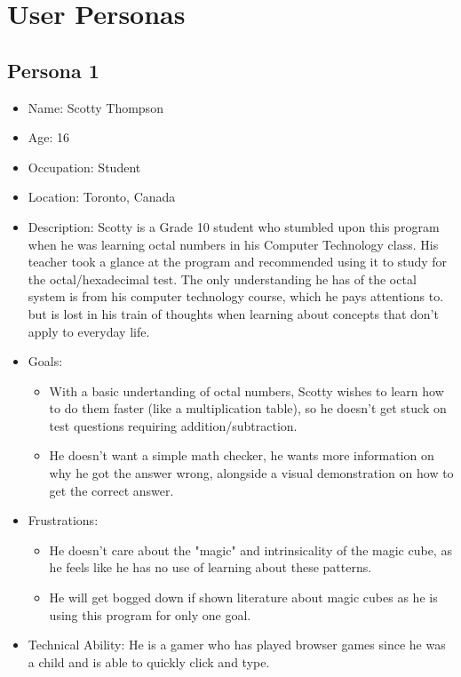 \documentclass[12pt]{article}
\begin{document}

\section{User Personas}

\subsection{Persona 1}
\begin{itemize}
\item Name: Scotty Thompson
\item Age: 16
\item Occupation: Student
\item Location: Toronto, Canada
\item Description: Scotty is a Grade 10 student who stumbled upon this program when he was learning octal numbers in his Computer Technology class. His teacher took a glance at the program and recommended using it to study for the octal/hexadecimal test. The only understanding he has of the octal system is from his computer technology course, which he pays attentions to. but is lost in his train of thoughts when learning about concepts that don't apply to everyday life.
\item Goals: 
\begin{itemize}
  \item With a basic undertanding of octal numbers, Scotty wishes to learn how to do them faster (like a multiplication table), so he doesn't get stuck on test questions requiring addition/subtraction.
  \item He doesn't want a simple math checker, he wants more information on why he got the answer wrong, alongside a visual demonstration on how to get the correct answer.
\end{itemize}
\item Frustrations:
\begin{itemize}
  \item He doesn't care about the "magic" and intrinsicality of the magic cube, as he feels like he has no use of learning about these patterns.
  \item He will get bogged down if shown literature about magic cubes as he is using this program for only one goal.
\end{itemize}
\item Technical Ability: He is a gamer who has played browser games since he was a child and is able to quickly click and type.
\end{itemize}
\end{document}
